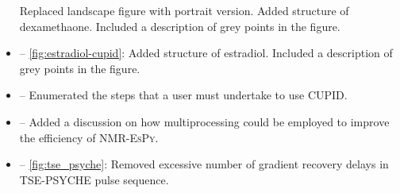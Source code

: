 \documentclass[12pt]{article}
\begin{document}
\begin{itemize}
            Replaced landscape figure with portrait version. Added structure of
            dexamethaone. Included a description of grey points in
            the figure.
        \item {} -- \cref{fig:estradiol-cupid}: Added
            structure of estradiol. Included a description of grey points in
            the figure.
        \item {} -- Enumerated the steps that a user
            must undertake to use CUPID.
        \item {} -- Added a discussion on how
            multiprocessing could be employed to improve the efficiency of
            \textsc{NMR-EsPy}.
        \item {} -- \cref{fig:tse_psyche}: Removed
            excessive number of gradient recovery delays in TSE-PSYCHE pulse
            sequence.
    \end{itemize}
\end{document}
